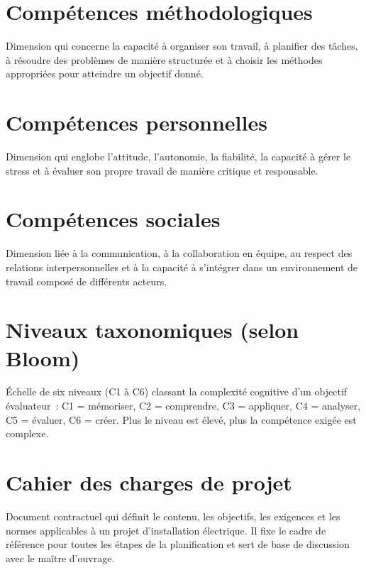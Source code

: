 \documentclass[a4paper,12pt,answers,addpoints]{exam}
\begin{document}
\begin{questions}
\begin{parts}
			\part[1]{Compétences méthodologiques}
			\begin{solution}
				Dimension qui concerne la capacité à organiser son travail, à planifier des tâches, à résoudre des problèmes de manière structurée et à choisir les méthodes appropriées pour atteindre un objectif donné.
			\end{solution}
			
			\part[1]{Compétences personnelles}
			\begin{solution}
				Dimension qui englobe l'attitude, l'autonomie, la fiabilité, la capacité à gérer le stress et à évaluer son propre travail de manière critique et responsable.
			\end{solution}
			
			\part[1]{Compétences sociales}
			\begin{solution}
				Dimension liée à la communication, à la collaboration en équipe, au respect des relations interpersonnelles et à la capacité à s'intégrer dans un environnement de travail composé de différents acteurs.
			\end{solution}
			
			\part[1]{Niveaux taxonomiques (selon Bloom)}
			\begin{solution}
				Échelle de six niveaux (C1 à C6) classant la complexité cognitive d'un objectif évaluateur~: C1 = mémoriser, C2 = comprendre, C3 = appliquer, C4 = analyser, C5 = évaluer, C6 = créer. Plus le niveau est élevé, plus la compétence exigée est complexe.
			\end{solution}
			
			\part[1]{Cahier des charges de projet}
			\begin{solution}
				Document contractuel qui définit le contenu, les objectifs, les exigences et les normes applicables à un projet d'installation électrique. Il fixe le cadre de référence pour toutes les étapes de la planification et sert de base de discussion avec le maître d'ouvrage.
			\end{solution}
			

\end{parts}
\end{questions}
\end{document}
